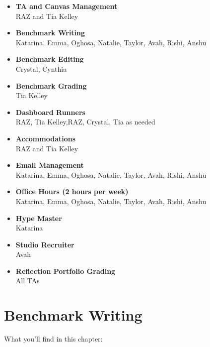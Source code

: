 \documentclass[
]{article}
\begin{document}
\begin{itemize}
\item
  \textbf{TA and Canvas Management}\\
  RAZ and Tia Kelley
\item
  \textbf{Benchmark Writing}\\
  Katarina, Emma, Oghosa, Natalie, Taylor, Avah, Rishi, Anshu
\item
  \textbf{Benchmark Editing}\\
  Crystal, Cynthia
\item
  \textbf{Benchmark Grading}\\
  Tia Kelley
\item
  \textbf{Dashboard Runners}\\
  RAZ, Tia Kelley,RAZ, Crystal, Tia as needed
\item
  \textbf{Accommodations}\\
  RAZ and Tia Kelley
\item
  \textbf{Email Management}\\
  Katarina, Emma, Oghosa, Natalie, Taylor, Avah, Rishi, Anshu
\item
  \textbf{Office Hours (2 hours per week)}\\
  Katarina, Emma, Oghosa, Natalie, Taylor, Avah, Rishi, Anshu
\item
  \textbf{Hype Master}\\
  Katarina
\item
  \textbf{Studio Recruiter}\\
  Avah
\item
  \textbf{Reflection Portfolio Grading}\\
  All TAs
\end{itemize}

\hypertarget{benchmark-writing}{%
\section{Benchmark Writing}\label{benchmark-writing}}

What you'll find in this chapter:
\end{document}
